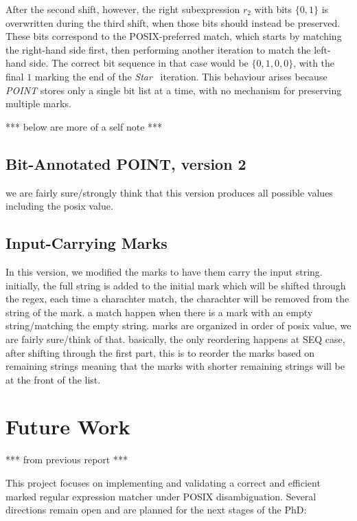 \documentclass[12pt]{article}
\newcommand{\Star}{\textit{Star }}
\newcommand{\POINT}{\textit{POINT }}
\begin{document}
\begin{enumerate}
  After the second shift, however, the right subexpression $r_2$ with bits $\{0,1\}$ is overwritten during 
  the third shift, when those bits should instead be preserved. These bits correspond to the POSIX-preferred match, 
  which starts by matching the right-hand side first, then performing another iteration to match 
  the left-hand side. The correct bit sequence in that case would be $\{0,1,0,0\}$, 
  with the final $1$ marking the end of the \Star\ iteration. This behaviour arises because 
  \POINT stores only a single bit list at a time, with no mechanism for preserving multiple marks.

\end{enumerate}

\newpage








*** below are more of a self note ***
\subsection{Bit-Annotated POINT, version 2}
we are fairly sure/strongly think that this version produces all possible values including the posix value.
\subsection{Input-Carrying Marks}
In this version, we modified the marks to have them carry the input string. initially, the full string is added to
the initial mark which will be shifted through the regex, each time a charachter match, the charachter will be removed
from the string of the mark. a match happen when there is a mark with an empty string/matching the empty string.
marks are organized in order of posix value, we are fairly sure/think of that. basically, the only reordering happens at
SEQ case, after shifting through the first part, this is to reorder the marks based on remaining strings meaning that
the marks with shorter remaining strings will be at the front of the list.


\section{Future Work}
*** from previous report ***

This project focuses on implementing and validating a correct and efficient marked regular expression matcher under POSIX disambiguation. Several directions remain open and are planned for the next stages of the PhD:
\end{document}
